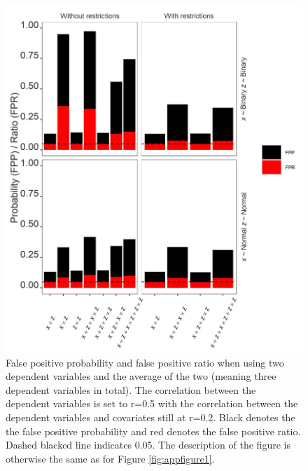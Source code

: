 \begin{landscape}
\scriptsize

\end{landscape}

\begin{figure}[hbt!]
\includegraphics{R/Analysis/Result/Figures/Figure3SI.jpeg}
\centering
\caption{False positive probability and false positive ratio when using two dependent variables and the average of the two (meaning three dependent variables in total). The correlation between the dependent variables is set to r=0.5 with the correlation between the dependent variables and covariates still at r=0.2. Black denotes the the false positive probability and red denotes the false positive ratio. Dashed blacked line indicates 0.05. The description of the figure is otherwise the same as for Figure \ref{fig:appfigure1}.}
\label{fig:appfigure3}
\end{figure}

\begin{landscape}
\scriptsize

\end{landscape}

